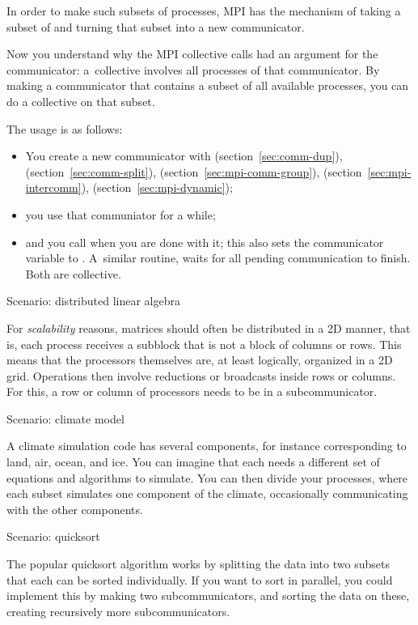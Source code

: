 In order to make such subsets of processes, MPI has the mechanism of
taking a subset of  and turning that subset
into a new communicator.

Now you understand why the MPI collective calls had an argument for the
communicator: a~collective involves all processes of that communicator.
By making a communicator that contains a subset of all available processes,
you can do a collective on that subset.

The usage is as follows:
\begin{itemize}
\item You create a new communicator with 
  (section~\ref{sec:comm-dup}),
   (section~\ref{sec:comm-split}),
   (section~\ref{sec:mpi-comm-group}),
   (section~\ref{sec:mpi-intercomm}),
   (section~\ref{sec:mpi-dynamic});
\item you use that communiator for a while;
\item and you call  when you are done with it;
  this also sets the communicator variable to .
  A~similar routine,  waits for all pending
  communication to finish. Both are collective.
\end{itemize}

 {Scenario: distributed linear algebra}

For \emph{scalability} reasons, matrices should often be distributed
in a 2D manner, that is, each process receives a subblock that is not
a block of columns or rows. This means that the processors themselves
are, at least logically, organized in a 2D grid. Operations
then involve reductions or broadcasts inside rows or columns. For
this, a row or column of processors needs to be in a subcommunicator.

 {Scenario: climate model}

A climate simulation code has several components, for instance corresponding
to land, air, ocean, and ice. You can imagine that each needs a different set
of equations and algorithms to simulate. You can then divide your processes,
where each subset simulates one component of the climate, occasionally communicating
with the other components.

 {Scenario: quicksort}

The popular quicksort algorithm works by splitting the data
into two subsets that each can be sorted individually.
If you want to sort in parallel, you could implement this by making two subcommunicators,
and sorting the data on these, creating recursively more subcommunicators.


